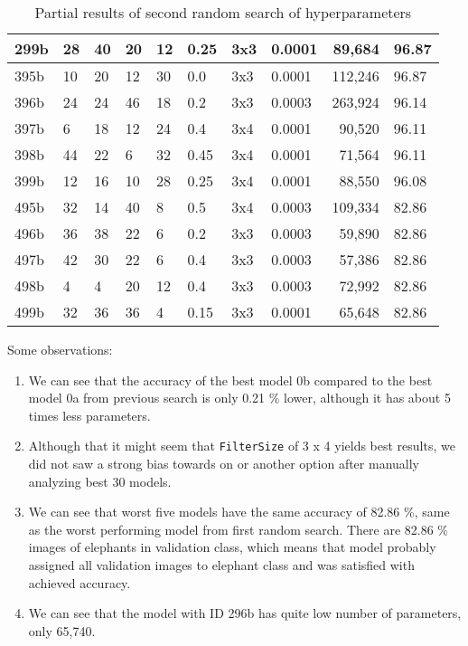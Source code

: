 \begin{table}
\begin{tabular}{llllllllrl}
      299b & 28 & 40 & 20 & 12 & 0.25 & 3x3 & 0.0001 &  89,684 & 96.87\\\midrule
      395b & 10 & 20 & 12 & 30 & 0.0  & 3x3 & 0.0001 & 112,246 & 96.87\\
      396b & 24 & 24 & 46 & 18 & 0.2  & 3x3 & 0.0003 & 263,924 & 96.14\\
      397b &  6 & 18 & 12 & 24 & 0.4  & 3x4 & 0.0001 &  90,520 & 96.11\\
      398b & 44 & 22 &  6 & 32 & 0.45 & 3x4 & 0.0001 &  71,564 & 96.11\\
      399b & 12 & 16 & 10 & 28 & 0.25 & 3x4 & 0.0001 &  88,550 & 96.08\\\midrule
      495b & 32 & 14 & 40 &  8 & 0.5  & 3x4 & 0.0003 & 109,334 & 82.86\\
      496b & 36 & 38 & 22 &  6 & 0.2  & 3x3 & 0.0003 &  59,890 & 82.86\\
      497b & 42 & 30 & 22 &  6 & 0.4  & 3x3 & 0.0003 &  57,386 & 82.86\\
      498b &  4 &  4 & 20 & 12 & 0.4  & 3x3 & 0.0003 &  72,992 & 82.86\\
      499b & 32 & 36 & 36 &  4 & 0.15 & 3x3 & 0.0001 &  65,648 & 82.86\\\bottomrule
    \end{tabular}
    \caption{ Partial results of second random search of hyperparameters}
    \label{hyper_results2}
\end{table}

Some observations:
\begin{enumerate}
    \item We can see that the accuracy of the best model 0b compared to the best model 0a from previous search is only 0.21 \% lower, although it has about 5 times less parameters.
    \item Although that it might seem that \verb|FilterSize| of 3 x 4 yields best results, we did not saw a strong bias towards on or another option after manually analyzing best 30 models.
    \item We can see that worst five models have the same accuracy of 82.86 \%, same as the worst performing model from first random search. There are 82.86 \% images of elephants in validation class, which means that model probably assigned all validation images to elephant class and was satisfied with achieved accuracy.
    \item We can see that the model with ID 296b has quite low number of parameters, only 65,740.
\end{enumerate}

